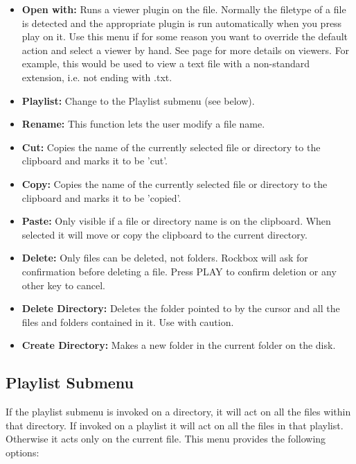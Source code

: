\begin{itemize}
\item \textbf{Open with:} Runs a viewer plugin on the file. Normally the filetype of a file is detected and the appropriate plugin is run automatically when you press play on it.  Use this menu if for some reason you want to override the default action and select a viewer by hand.  See page \textmd{\pageref{ref:Viewersplugins}} for more details on viewers. For example, this would be used to view a text file with a non-standard extension, i.e. not ending with .txt.
\item \textbf{Playlist:} Change to the Playlist submenu (see below).
\item \textbf{Rename:} This function lets the user modify a file name.
\item \textbf{Cut:} Copies the name of the currently selected file or directory to the clipboard and marks it to be 'cut'.
\item \textbf{Copy:} Copies the name of the currently selected file or directory to the clipboard and marks it to be 'copied'.
\item \textbf{Paste:} Only visible if a file or directory name is on the clipboard. When selected it will move or copy the clipboard to the current directory. 
\item \textbf{Delete:} Only files can be deleted, not folders. Rockbox will ask for confirmation before deleting a file. Press PLAY to confirm deletion or any other key to cancel.
\item \textbf{Delete Directory:} Deletes the folder pointed to by the cursor and all the files and folders contained in it.  Use with caution.
\item \textbf{Create Directory:} Makes a new folder in the current folder on the disk.
\end{itemize}

\subsection{\label{ref:Playlistsubmenu}Playlist Submenu}
If the playlist submenu is invoked on a directory, it will act on all the files within that directory.  If invoked on a playlist it will act on all the files in that playlist. Otherwise it acts only on the current file.
This menu provides the following options:

